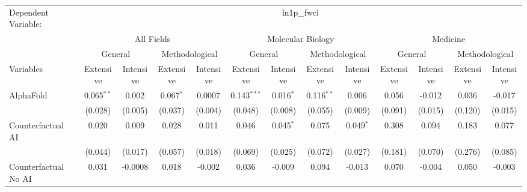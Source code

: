\begingroup
\centering
\begin{tabular}{lcccccccccccc}
   \tabularnewline \midrule \midrule
   Dependent Variable: & \multicolumn{12}{c}{ln1p\_fwci}\\
 & \multicolumn{4}{c}{All Fields} & \multicolumn{4}{c}{Molecular Biology} & \multicolumn{4}{c}{Medicine} \\
\cmidrule(lr){2-5} \cmidrule(lr){6-9} \cmidrule(lr){10-13}
 & \multicolumn{2}{c}{General} & \multicolumn{2}{c}{Methodological} & \multicolumn{2}{c}{General} & \multicolumn{2}{c}{Methodological} & \multicolumn{2}{c}{General} & \multicolumn{2}{c}{Methodological} \\
\cmidrule(lr){2-3} \cmidrule(lr){4-5} \cmidrule(lr){6-7} \cmidrule(lr){8-9} \cmidrule(lr){10-11} \cmidrule(lr){12-13}
Variables & \multicolumn{1}{c}{Extensive} & \multicolumn{1}{c}{Intensive} & \multicolumn{1}{c}{Extensive} & \multicolumn{1}{c}{Intensive} & \multicolumn{1}{c}{Extensive} & \multicolumn{1}{c}{Intensive} & \multicolumn{1}{c}{Extensive} & \multicolumn{1}{c}{Intensive} & \multicolumn{1}{c}{Extensive} & \multicolumn{1}{c}{Intensive} & \multicolumn{1}{c}{Extensive} & \multicolumn{1}{c}{Intensive} \\
\cmidrule(lr){1-1}\cmidrule(lr){2-2} \cmidrule(lr){3-3} \cmidrule(lr){4-4} \cmidrule(lr){5-5} \cmidrule(lr){6-6} \cmidrule(lr){7-7} \cmidrule(lr){8-8} \cmidrule(lr){9-9} \cmidrule(lr){10-10} \cmidrule(lr){11-11} \cmidrule(lr){12-12} \cmidrule(lr){13-13}
   AlphaFold                                & 0.065$^{**}$   & 0.002        & 0.067$^{*}$   & 0.0007      & 0.143$^{***}$ & 0.016$^{*}$ & 0.116$^{**}$ & 0.006       & 0.056   & -0.012   & 0.036   & -0.017\\   
                                            & (0.028)        & (0.005)      & (0.037)       & (0.004)     & (0.048)       & (0.008)     & (0.055)      & (0.009)     & (0.091) & (0.015)  & (0.120) & (0.015)\\   
   Counterfactual AI                        & 0.020          & 0.009        & 0.028         & 0.011       & 0.046         & 0.045$^{*}$ & 0.075        & 0.049$^{*}$ & 0.308   & 0.094    & 0.183   & 0.077\\   
                                            & (0.044)        & (0.017)      & (0.057)       & (0.018)     & (0.069)       & (0.025)     & (0.072)      & (0.027)     & (0.181) & (0.070)  & (0.276) & (0.085)\\   
   Counterfactual No AI                     & 0.031          & -0.0008      & 0.018         & -0.002      & 0.036         & -0.009      & 0.094        & -0.013      & 0.070   & -0.004   & 0.050   & -0.003\\   

\end{tabular}
